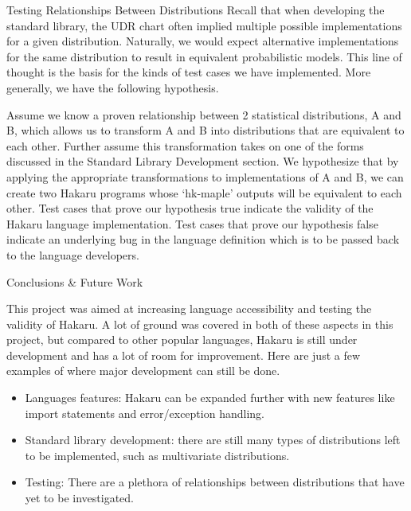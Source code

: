 \documentclass[22pt]{beamer}
\begin{document}
\begin{frame}[fragile]
\begin{textblock}{5}
\begin{block}{\Large{Testing Relationships Between Distributions}}
\scriptsize{Recall that when developing the standard library, the UDR chart often implied multiple possible implementations for a given distribution. Naturally, we would expect alternative implementations for the same distribution to result in equivalent probabilistic models. This line of thought is the basis for the kinds of test cases we have implemented. More generally, we have the following hypothesis.}

\bigskip

\scriptsize{Assume we know a proven relationship between 2 statistical distributions, A and B, which allows us to transform A and B into distributions that are equivalent to each other. Further assume this transformation takes on one of the forms discussed in the Standard Library Development section. We hypothesize that by applying the appropriate transformations to implementations of A and B, we can create two Hakaru programs whose `hk-maple' outputs will be equivalent to each other. Test cases that prove our hypothesis true indicate the validity of the Hakaru language implementation. Test cases that prove our hypothesis false indicate an underlying bug in the language definition which is to be passed back to the language developers.
}

\end{block}


\begin{block}{\Large{Conclusions \& Future Work}}

\scriptsize{This project was aimed at increasing language accessibility and testing the validity of Hakaru. A lot of ground was covered in both of these aspects in this project, but compared to other popular languages, Hakaru is still under development and has a lot of room for improvement. Here are just a few examples of where major development can still be done.

\begin{itemize}
    \item Languages features: Hakaru can be expanded further with new features like import statements and error/exception handling. 
    \item Standard library development: there are still many types of  distributions left to be implemented, such as multivariate distributions.
    \item Testing: There are a plethora of relationships between distributions that have yet to be investigated.  
\end{itemize}

}
\end{block}
\end{textblock}
\end{frame}
\end{document}
